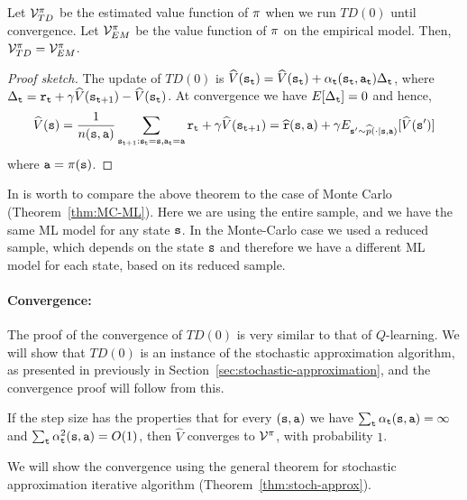 \begin{theorem}
Let $\mathcal{V}^\pi_{TD}$ be the estimated value function of
$\pi$ when we run $TD(0)$ until convergence. Let
$\mathcal{V}^\pi_{EM}$ be the value function of $\pi$ on the
empirical model. Then, $\mathcal{V}^\pi_{TD}=\mathcal{V}^\pi_{EM}$.
\end{theorem}

\begin{proof}[Proof sketch]
The update of $TD(0)$ is
$\widehat{V}({\tt s}_{\tt t})=\widehat{V}({\tt s}_{\tt t})+\alpha_{\tt t}({\tt s}_{\tt t},{\tt a}_{\tt t})\Delta_{\tt t}$,
where $\Delta_{\tt t}={\tt r}_{\tt t}+\gamma
\widehat{V}({\tt s}_{{\tt t}+1})-\widehat{V}({\tt s}_{\tt t})$. At
convergence we have $E[\Delta_{\tt t}]=0$ and hence,
\[
\widehat{V}({\tt s})=\frac{1}{n({\tt s},{\tt a})}\sum_{{\tt s}_{{\tt t}+1}:{\tt s}_{\tt t}={\tt s},{\tt a}_{\tt t}={\tt a}}
{\tt r}_{\tt t}+\gamma
\widehat{V}({\tt s}_{{\tt t}+1})=\widehat{{\tt r}}({\tt s},{\tt a})+\gamma
E_{{\tt s}'\sim
\widehat{p}(\cdot|{\tt s},{\tt a})}[\widehat{V}({\tt s}')]
\]
where ${\tt a}=\pi({\tt s})$.
\end{proof}

In is worth to compare the above theorem to the case of Monte Carlo
(Theorem~\ref{thm:MC-ML}). Here we are using the entire sample, and
we have the same ML model for any state ${\tt s}$. In the Monte-Carlo
case we used a reduced sample, which depends on the state ${\tt s}$
and therefore we have a different ML model for each state, based on
its reduced sample.

\paragraph{Convergence:} The proof of the convergence of $TD(0)$ is very
similar to that of $Q$-learning. We will show that $TD(0)$ is an
instance of the stochastic approximation algorithm, as presented in
previously in Section~\ref{sec:stochastic-approximation}, and the
convergence proof will follow from this.

\begin{theorem}[Convergence $TD(0)$]
\label{thm:TD0-conrg} If the step size has the properties that for
every $({\tt s},{\tt a})$ we have $\sum_{\tt t}
\alpha_{\tt t}({\tt s},{\tt a})=\infty $ and $\sum_{\tt t}
\alpha_{\tt t}^2({\tt s},{\tt a})=O(1)$, then $\widehat{V}$ converges
to $\mathcal{V}^\pi$, with probability $1$.
\end{theorem}

We will show the convergence using the general theorem for
stochastic approximation iterative algorithm
(Theorem~\ref{thm:stoch-approx}).

